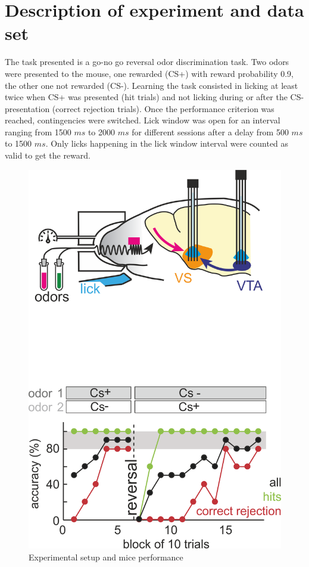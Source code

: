 \section{Description of experiment and data set}
The task presented is a go-no go reversal odor discrimination task. Two odors were presented to the mouse, one rewarded (CS+) with reward probability 0.9, the other one not rewarded (CS-). Learning the task consisted in licking at least twice when CS+ was presented (hit trials) and not licking during or after the CS- presentation (correct rejection trials). Once the performance criterion was reached, contingencies were switched. Lick window was open for an interval ranging from 1500 $ms$ to 2000 $ms$ for different sessions after a delay from 500 $ms$ to 1500 $ms$. Only licks happening in the lick window interval were counted as valid to get the reward.
\begin{figure}
    \centering
    \includegraphics[scale=0.3]{figures/experiment.png}
    \caption{Experimental setup and mice performance}
    \label{fig:experiment}
\end{figure}
